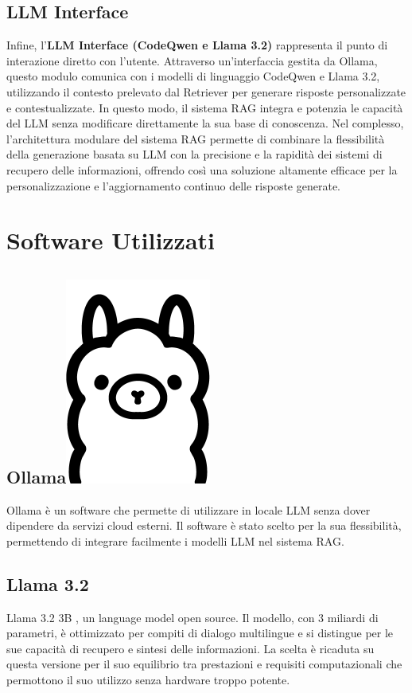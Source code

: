 \documentclass[12pt,a4paper,openright,twoside]{book}
\begin{document}
\subsection{LLM Interface}
Infine, l'\textbf{LLM Interface (CodeQwen e Llama 3.2)} rappresenta il punto di interazione diretto con l'utente. Attraverso un'interfaccia gestita da Ollama, questo modulo comunica con i modelli di linguaggio CodeQwen e Llama 3.2, utilizzando il contesto prelevato dal Retriever per generare risposte personalizzate e contestualizzate. In questo modo, il sistema RAG integra e potenzia le capacità del LLM senza modificare direttamente la sua base di conoscenza.
Nel complesso, l'architettura modulare del sistema RAG permette di combinare la flessibilità della generazione basata su LLM con la precisione e la rapidità dei sistemi di recupero delle informazioni, offrendo così una soluzione altamente efficace per la personalizzazione e l'aggiornamento continuo delle risposte generate.
\section{Software Utilizzati}
\subsection{Ollama\hspace{0.3cm}\protect\includegraphics[width=0.03\linewidth]{figures/ollama.png}}
Ollama \cite{ollama-docs} è un software che permette di utilizzare in locale LLM
senza dover dipendere da servizi cloud esterni.
Il software è stato scelto per la sua flessibilità, permettendo di integrare facilmente i modelli LLM nel sistema RAG.

\subsection{Llama 3.2}
Llama 3.2 3B \cite{llama3-2}, un language model open source.
Il modello, con 3 miliardi di parametri, è ottimizzato per compiti di dialogo multilingue e si distingue per le sue capacità di recupero e sintesi delle informazioni.
La scelta è ricaduta su questa versione per il suo equilibrio tra prestazioni e requisiti computazionali che permottono il suo utilizzo senza hardware troppo potente.
\end{document}
